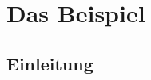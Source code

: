 \documentclass[paper=a4,10pt,DIV=classic]{scrbook}
\begin{document}
\chapter{Das Beispiel}

\section{Einleitung}

\blindtext[2]

\begin{pages}
\begin{Leftside}
\beginnumbering

\begin{otherlanguage}{latin}
  \noindent\blindtext[2]
\end{otherlanguage}
\pend
\endnumbering
\end{Leftside}

\begin{Rightside}
\beginnumbering

\noindent\blindtext[2]
\pend
\endnumbering
\end{Rightside}
\end{pages}
\Pages
\end{document}
